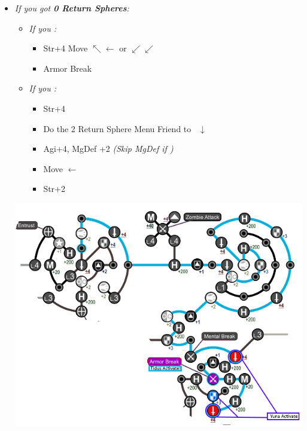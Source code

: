 \begin{spheregrid}
\begin{multicols}{2}
\begin{itemize}
\begin{itemize}
        \item \textit{If you got \textbf{0 Return Spheres}:}
              \begin{itemize}
              \item \textit{If you \wonblitz:}
              \begin{itemize}
                \tidusf Move to Str+4 by Mental Break $\rightarrow x3, \downarrow, \rightarrow x3$
                \yunaf Friend Sphere to \tidus
                \item Str+4
                \tidusf Move $\nwarrow\leftarrow$ or $\swarrow\swarrow$
                \item Armor Break
                \end{itemize}
		\item \textit{If you \lostblitz:}
                \begin{itemize}
                \tidusf Move to Armor Break $\rightarrow x3, \downarrow x6$
                \tidusf Armor Break
                \tidusf Move to HP $\searrow\searrow$
                      \yunaf Friend Sphere to \tidus
                \item Str+4
                \item Do the 2 Return Sphere Menu
                \yunaf Friend to \rikku\ $\downarrow$
                \item Agi+4, MgDef +2 \textit{(Skip MgDef if \blitzloss)}
                \item Move $\leftarrow$
                \item Str+2
                \end{itemize}
              \end{itemize}
              \includegraphics[width=.9\columnwidth]{graphics/0_returns}

\end{itemize}
\end{itemize}
\end{multicols}
\end{spheregrid}

